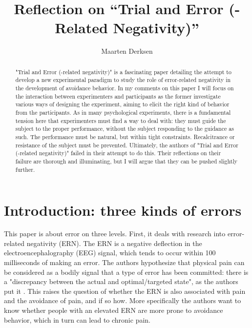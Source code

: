 \documentclass[twocolumn, serif, authordate, reflection]{jote-article}
\title{Reflection on  \text{ }\hspace{\textwidth}``Trial and Error (-Related Negativity)''}
\author[1]{Maarten Derksen}
\affil[1]{Maarten Derksen, Theory \& History of Psychology, University of Groningen}
\begin{document}
\setcounter{page}{39}
\begin{frontmatter}
\maketitle
\begin{abstract}
    "Trial and Error (-related negativity)" is a fascinating paper detailing the attempt to develop a new experimental paradigm to study the role of error-related negativity in the development of avoidance behavior. In my comments on this paper I will focus on the interaction between experimenters and participants as the former investigate various ways of designing the experiment, aiming to elicit the right kind of behavior from the participants. As in many psychological experiments, there is a fundamental tension here that experimenters must find a way to deal with: they must guide the subject to the proper performance, without the subject responding to the guidance as such. The performance must be natural, but within tight constraints. Recalcitrance or resistance of the subject must be prevented. Ultimately, the authors of "Trial and Error (-related negativity)" failed in their attempt to do this. Their reflections on their failure are thorough and illuminating, but I will argue that they can be pushed slightly further.
\end{abstract}
\end{frontmatter}






  {}
 \section*{Introduction: three kinds of errors}

This paper is about error on three levels. First, it deals with research into error-related negativity (ERN). The ERN is a negative deflection in the electroencephalography (EEG) signal, which tends to occur within 100 milliseconds of making an error. The authors hypothesize that physical pain can be considered as a bodily signal that a type of error has been committed: there is a "discrepancy between the actual and optimal/targeted state", as the authors put it \parencite[p.27]{Traxler2020}. This raises the question of whether the ERN is also associated with pain and the avoidance of pain, and if so how. More specifically the authors want to know whether people with an elevated ERN are more prone to avoidance behavior, which in turn can lead to chronic pain.
\end{document}
